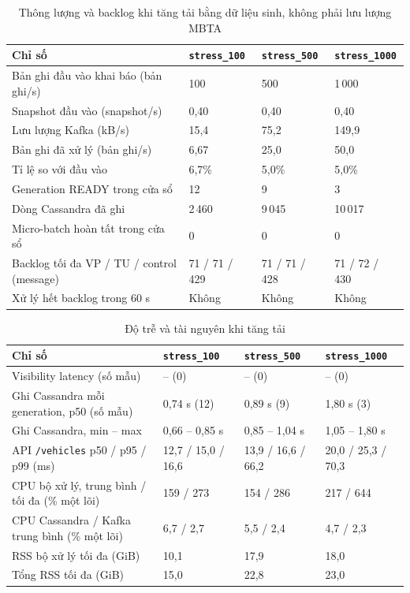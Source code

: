 \begin{table}[H]
\centering
\tablefont
\caption{Thông lượng và backlog khi tăng tải bằng dữ liệu sinh, không phải lưu lượng MBTA}
\label{tab:stress}
\begin{tabular}{p{6.6cm}p{2.5cm}p{2.5cm}p{2.5cm}}
\toprule
\textbf{Chỉ số} & \texttt{stress\_100} & \texttt{stress\_500} & \texttt{stress\_1000} \\
\midrule
Bản ghi đầu vào khai báo (bản ghi/s) & 100 & 500 & 1\,000 \\
Snapshot đầu vào (snapshot/s) & 0,40 & 0,40 & 0,40 \\
Lưu lượng Kafka (kB/s) & 15,4 & 75,2 & 149,9 \\
Bản ghi đã xử lý (bản ghi/s) & 6,67 & 25,0 & 50,0 \\
Tỉ lệ so với đầu vào & 6,7\% & 5,0\% & 5,0\% \\
Generation READY trong cửa sổ & 12 & 9 & 3 \\
Dòng Cassandra đã ghi & 2\,460 & 9\,045 & 10\,017 \\
Micro-batch hoàn tất trong cửa sổ & 0 & 0 & 0 \\
Backlog tối đa VP / TU / control (message) & 71 / 71 / 429 & 71 / 71 / 428 & 71 / 72 / 430 \\
Xử lý hết backlog trong 60 s & Không & Không & Không \\
\bottomrule
\end{tabular}
\end{table}

\begin{table}[H]
\centering
\tablefont
\caption{Độ trễ và tài nguyên khi tăng tải}
\label{tab:stressres}
\begin{tabular}{p{6.6cm}p{2.5cm}p{2.5cm}p{2.5cm}}
\toprule
\textbf{Chỉ số} & \texttt{stress\_100} & \texttt{stress\_500} & \texttt{stress\_1000} \\
\midrule
Visibility latency (số mẫu) & -- (0) & -- (0) & -- (0) \\
Ghi Cassandra mỗi generation, p50 (số mẫu) & 0,74 s (12) & 0,89 s (9) & 1,80 s (3) \\
Ghi Cassandra, min -- max & 0,66 -- 0,85 s & 0,85 -- 1,04 s & 1,05 -- 1,80 s \\
API \texttt{/vehicles} p50 / p95 / p99 (ms) & 12,7 / 15,0 / 16,6 & 13,9 / 16,6 / 66,2 & 20,0 / 25,3 / 70,3 \\
CPU bộ xử lý, trung bình / tối đa (\% một lõi) & 159 / 273 & 154 / 286 & 217 / 644 \\
CPU Cassandra / Kafka trung bình (\% một lõi) & 6,7 / 2,7 & 5,5 / 2,4 & 4,7 / 2,3 \\
RSS bộ xử lý tối đa (GiB) & 10,1 & 17,9 & 18,0 \\
Tổng RSS tối đa (GiB) & 15,0 & 22,8 & 23,0 \\
\bottomrule
\end{tabular}
\end{table}

